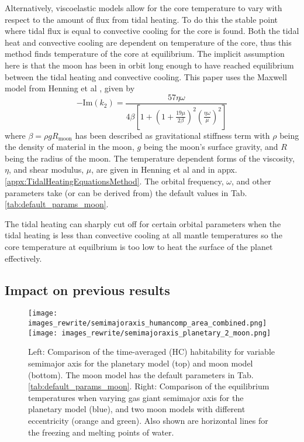 \documentclass[12pt, onecolumn]{revtex4-2}    %
\begin{document}
Alternatively, viscoelastic models allow for the core temperature to vary with respect to the amount of flux from tidal heating.
To do this the stable point where tidal flux is equal to convective cooling for the core is found.
Both the tidal heat and convective cooling are dependent on temperature of the core, thus this method finds temperature of the core at equilibrium.
The implicit assumption here is that the moon has been in orbit long enough to have reached equilibrium between the tidal heating and convective cooling.
This paper uses the Maxwell model from Henning et al \cite{Henning2009}, given by
\begin{equation}
  -\text{Im}(k_2) = \frac{57 \eta \omega} 
  {4 \beta \left[ 1 + \left(1 + \frac{19 \mu}{2 \beta}\right)^2 
  \left(\frac{\eta \omega}{\mu}\right)^2 \right]}
  \label{eq:imk2_maxwell}
\end{equation}
where $\beta = \rho g R_\text{moon}$ has been described as gravitational stiffness term with $\rho$ being the density of material in the moon, $g$ being the moon's surface gravity, and $R$ being the radius of the moon.
The temperature dependent forms of the viscosity, $\eta$, and shear modulus, $\mu$, are given in Henning et al \cite{DobosTurner2015} and in appx. \ref{appx:TidalHeatingEquationsMethod}. 
The orbital frequency, $\omega$, and other parameters take (or can be derived from) the default values in Tab. \ref{tab:default_params_moon}.

The tidal heating can sharply cut off for certain orbital parameters when the tidal heating is less than convective cooling at all mantle temperatures so the core temperature at equilbrium is too low to heat the surface of the planet effectively.


\subsection{Impact on previous results} \label{ssec:Impact_previous_results}
%
\begin{figure}[t]
  \texttt{[image: images\_rewrite/semimajoraxis\_humancomp\_area\_combined.png]}
  \texttt{[image: images\_rewrite/semimajoraxis\_planetary\_2\_moon.png]}
  \caption{
    Left: Comparison of the time-averaged (HC) habitability for variable semimajor axis for the planetary model (top) and moon model (bottom). 
    The moon model has the default parameters in Tab. \ref{tab:default_params_moon}.
    Right: Comparison of the equilibrium temperatures when varying gas giant semimajor axis for the planetary model (blue), and two moon models with different eccentricity (orange and green).
    Also shown are horizontal lines for the freezing and melting points of water.
  }
  \label{fig:semimajoraxiscomparision}
\end{figure}
\end{document}
